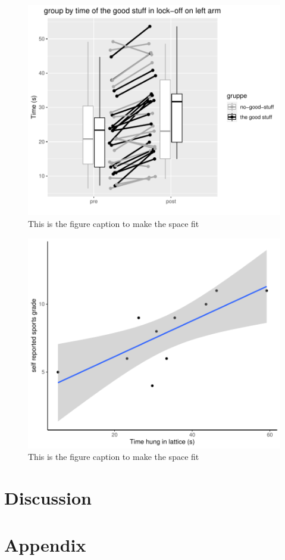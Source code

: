 \documentclass[
]{article}
\begin{document}
\begin{figure}
\centering
\includegraphics{Data-analysis_files/figure-latex/unnamed-chunk-7-1.pdf}
\caption{This is the figure caption to make the space fit}
\end{figure}

\begin{figure}
\centering
\includegraphics{Data-analysis_files/figure-latex/unnamed-chunk-10-1.pdf}
\caption{This is the figure caption to make the space fit}
\end{figure}

\hypertarget{discussion}{%
\section{Discussion}\label{discussion}}

\hypertarget{appendix}{%
\section{Appendix}\label{appendix}}
\end{document}
